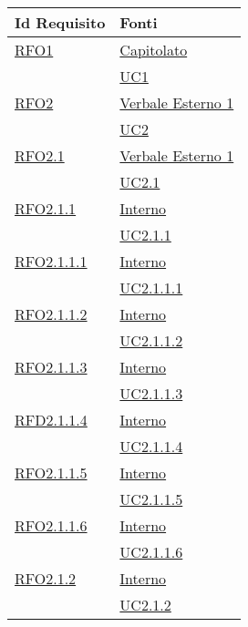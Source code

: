 \normalsize
\begin{longtable}{|>{\centering}m{5cm}|m{5cm}<{\centering}|}
\hline
\textbf{Id Requisito} & \textbf{Fonti}\\
\hline
\endhead
\hyperlink{RFO1}{RFO1} & \hyperlink{Capitolato}{Capitolato}\\
& \hyperref[UC1]{UC1}\\ \hline

\hyperlink{RFO2}{RFO2} & \hyperlink{Verbale Esterno 1}{Verbale Esterno 1}\\
& \hyperref[UC2]{UC2}\\ \hline

\hyperlink{RFO2.1}{RFO2.1} & \hyperlink{Verbale Esterno 1}{Verbale Esterno 1}\\
& \hyperref[UC2.1]{UC2.1}\\ \hline

\hyperlink{RFO2.1.1}{RFO2.1.1} & \hyperlink{Interno}{Interno}\\
& \hyperref[UC2.1.1]{UC2.1.1}\\ \hline

\hyperlink{RFO2.1.1.1}{RFO2.1.1.1} & \hyperlink{Interno}{Interno}\\
& \hyperref[UC2.1.1.1]{UC2.1.1.1}\\ \hline

\hyperlink{RFO2.1.1.2}{RFO2.1.1.2} & \hyperlink{Interno}{Interno}\\
& \hyperref[UC2.1.1.2]{UC2.1.1.2}\\ \hline

\hyperlink{RFO2.1.1.3}{RFO2.1.1.3} & \hyperlink{Interno}{Interno}\\
& \hyperref[UC2.1.1.3]{UC2.1.1.3}\\ \hline

\hyperlink{RFD2.1.1.4}{RFD2.1.1.4} & \hyperlink{Interno}{Interno}\\
& \hyperref[UC2.1.1.4]{UC2.1.1.4}\\ \hline

\hyperlink{RFO2.1.1.5}{RFO2.1.1.5} & \hyperlink{Interno}{Interno}\\
& \hyperref[UC2.1.1.5]{UC2.1.1.5}\\ \hline

\hyperlink{RFO2.1.1.6}{RFO2.1.1.6} & \hyperlink{Interno}{Interno}\\
& \hyperref[UC2.1.1.6]{UC2.1.1.6}\\ \hline

\hyperlink{RFO2.1.2}{RFO2.1.2} & \hyperlink{Interno}{Interno}\\
& \hyperref[UC2.1.2]{UC2.1.2}\\ \hline


\end{longtable}
